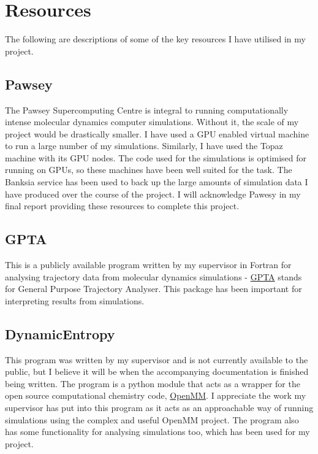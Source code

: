 \documentclass[11pt]{article}
\begin{document}
\section{Resources}

The following are descriptions of some of the key resources I have utilised in my project.

\subsection{Pawsey}

The Pawsey Supercomputing Centre is integral to running computationally intense molecular dynamics computer simulations. Without it, the scale of my project would be drastically smaller. I have used a GPU enabled virtual machine to run a large number of my simulations. Similarly, I have used the Topaz machine with its GPU nodes. The code used for the simulations is optimised for running on GPUs, so these machines have been well suited for the task. The Banksia service has been used to back up the large amounts of simulation data I have produced over the course of the project. I will acknowledge Pawesy in my final report providing these resources to complete this project.

\subsection{GPTA}
\label{sec:GPTA}

This is a publicly available program written by my supervisor in Fortran for analysing trajectory data from molecular dynamics simulations - \href{https://github.com/praiteri/GPTA}{GPTA} stands for General Purpose Trajectory Analyser. This package has been important for interpreting results from simulations.

\subsection{DynamicEntropy}
\label{sec:dynaEn}

This program was written by my supervisor and is not currently available to the public, but I believe it will be when the accompanying documentation is finished being written. The program is a python module that acts as a wrapper for the open source computational chemistry code, \href{https://github.com/openmm/openmm}{OpenMM}. I appreciate the work my supervisor has put into this program as it acts as an approachable way of running simulations using the complex and useful OpenMM project. The program also has some functionality for analysing simulations too, which has been used for my project.
\end{document}
